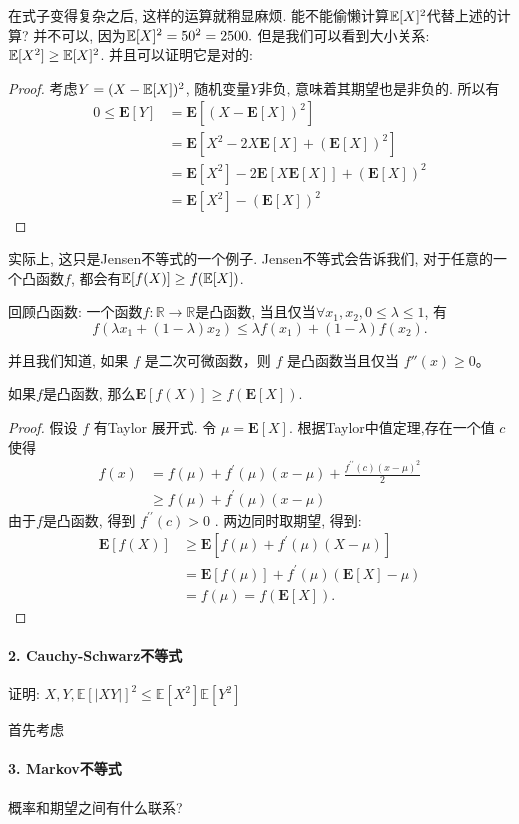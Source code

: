 在式子变得复杂之后, 这样的运算就稍显麻烦. 能不能偷懒计算$\mathbb E[X]^2$代替上述的计算? 并不可以, 因为$\mathbb E[X]^2=50^2=2500.$ 但是我们可以看到大小关系: $\mathbb E[X^2]\geq \mathbb E[X]^2$. 并且可以证明它是对的: 
\begin{proof}
    考虑$Y=(X-\mathbb E[X])^2$, 随机变量$Y$非负, 意味着其期望也是非负的. 所以有
    $$
\begin{aligned}
0 \leq \mathbf{E}[Y] & =\mathbf{E}\left[(X-\mathbf{E}[X])^2\right] \\
& =\mathbf{E}\left[X^2-2 X \mathbf{E}[X]+(\mathbf{E}[X])^2\right] \\
& =\mathbf{E}\left[X^2\right]-2 \mathbf{E}[X \mathbf{E}[X]]+(\mathbf{E}[X])^2 \\
& =\mathbf{E}\left[X^2\right]-(\mathbf{E}[X])^2
\end{aligned}
$$
\end{proof}

实际上, 这只是Jensen不等式的一个例子. Jensen不等式会告诉我们, 对于任意的一个凸函数$f$, 都会有$\mathbb E[f(X)]\geq f(\mathbb E[X])$. 

\begin{asidebox}
回顾凸函数: 一个函数$f:\mathbb R \to \mathbb R$是凸函数, 当且仅当$\forall x_1, x_2, 0\leq \lambda \leq 1$, 有$$
f\left(\lambda x_1+(1-\lambda) x_2\right) \leq \lambda f\left(x_1\right)+(1-\lambda) f\left(x_2\right) .
$$

并且我们知道, 如果 $f$ 是二次可微函数，则 $f$ 是凸函数当且仅当 $f''(x)\geq 0$。
\end{asidebox}

\begin{theorem}
    如果$f$是凸函数, 那么$\mathbf{E}[f(X)] \geq f(\mathbf{E}[X])$. 
\end{theorem}

\begin{proof}
    假设 $f$ 有Taylor 展开式. 令 $\mu=\mathbf{E}[X]$. 根据Taylor中值定理,存在一个值 $c$ 使得
$$
\begin{aligned}
f(x) & =f(\mu)+f^{\prime}(\mu)(x-\mu)+\frac{f^{\prime \prime}(c)(x-\mu)^2}{2} \\
& \geq f(\mu)+f^{\prime}(\mu)(x-\mu)
\end{aligned}
$$
由于$f$是凸函数, 得到 $f^{\prime \prime}(c)>0$ . 两边同时取期望, 得到: 
$$
\begin{aligned}
\mathbf{E}[f(X)] & \geq \mathbf{E}\left[f(\mu)+f^{\prime}(\mu)(X-\mu)\right] \\
& =\mathbf{E}[f(\mu)]+f^{\prime}(\mu)(\mathbf{E}[X]-\mu) \\
& =f(\mu)=f(\mathbf{E}[X]) .
\end{aligned}
$$
\end{proof}

\paragraph{2. Cauchy-Schwarz不等式}
证明:  $ X, Y , \mathbb{E}[|X Y|]^2 \leqslant \mathbb{E}\left[X^2\right] \mathbb{E}\left[Y^2\right]$
    
  
    
    首先考虑

\paragraph{3. Markov不等式} 概率和期望之间有什么联系? 



